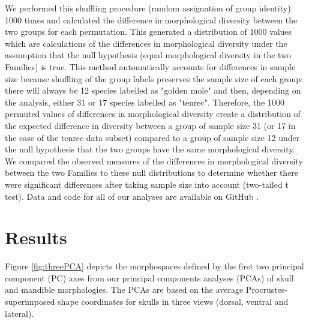 \documentclass[12pt,a4paper]{article}
\begin{document}
	We performed this shuffling procedure (random assignation of group identity) 1000 times and calculated the difference in morphological diversity between the two groups for each permutation. This generated a distribution of 1000 values which are calculations of the differences in morphological diversity under the assumption that the null hypothesis (equal morphological diversity in the two Families) is true. This method automatically accounts for differences in sample size because shuffling of the group labels preserves the sample size of each group: there will always be 12 species labelled as "golden mole" and then, depending on the analysis, either 31 or 17 species labelled as "tenrec". Therefore, the 1000 permuted values of differences in morphological diversity create a distribution of the expected difference in diversity between a group of sample size 31 (or 17 in the case of the tenrec data subset) compared to a group of sample size 12 under the null hypothesis that the two groups have the same morphological diversity. We compared the observed measures of the differences in morphological diversity between the two Families to these null distributions to determine whether there were significant differences after taking sample size into account (two-tailed t test). Data and code for all of our analyses are available on GitHub \citep{Finlay2015c}.

\section{Results} 
	Figure \ref{fig:threePCA} depicts the morphospaces defined by the first two principal component (PC) axes from our principal components analyses (PCAs) of skull and mandible morphologies. The PCAs are based on the average Procrustes-superimposed shape coordinates for skulls in three views (dorsal, ventral and lateral).
\end{document}
